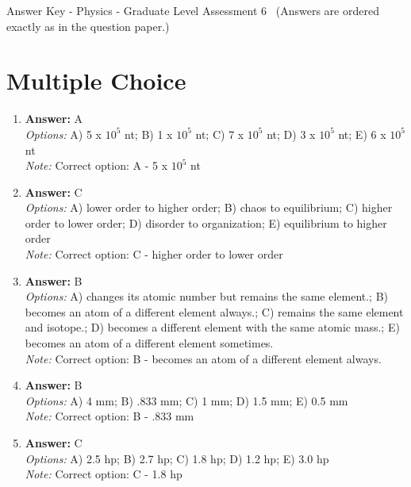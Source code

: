 \documentclass[12pt]{article}
\begin{document}
\begin{center}
Answer Key - Physics - Graduate Level Assessment 6 \
\small (Answers are ordered exactly as in the question paper.)
\end{center}

\section*{Multiple Choice}
\begin{enumerate}[label=\arabic*.]
\item \textbf{Answer:} A
\\ \textit{Options:} A) 5 x $10^5$ nt; B) 1 x $10^5$ nt; C) 7 x $10^5$ nt; D) 3 x $10^5$ nt; E) 6 x $10^5$ nt
\\ \textit{Note:} Correct option: A - 5 x $10^5$ nt
\item \textbf{Answer:} C
\\ \textit{Options:} A) lower order to higher order; B) chaos to equilibrium; C) higher order to lower order; D) disorder to organization; E) equilibrium to higher order
\\ \textit{Note:} Correct option: C - higher order to lower order
\item \textbf{Answer:} B
\\ \textit{Options:} A) changes its atomic number but remains the same element.; B) becomes an atom of a different element always.; C) remains the same element and isotope.; D) becomes a different element with the same atomic mass.; E) becomes an atom of a different element sometimes.
\\ \textit{Note:} Correct option: B - becomes an atom of a different element always.
\item \textbf{Answer:} B
\\ \textit{Options:} A) 4 mm; B) .833 mm; C) 1 mm; D) 1.5 mm; E) 0.5 mm
\\ \textit{Note:} Correct option: B - .833 mm
\item \textbf{Answer:} C
\\ \textit{Options:} A) 2.5 hp; B) 2.7 hp; C) 1.8 hp; D) 1.2 hp; E) 3.0 hp
\\ \textit{Note:} Correct option: C - 1.8 hp
\end{enumerate}
\end{document}
